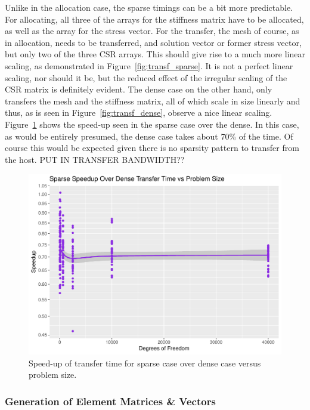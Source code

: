 Unlike in the allocation case, the sparse timings can be a bit more predictable. For allocating, all three of the arrays for the stiffness matrix have to be allocated, as well as the array for the stress vector. For the transfer, the mesh of course, as in allocation, needs to be transferred, and solution vector or former stress vector, but only two of the three CSR arrays. This should give rise to a much more linear scaling, as demonstrated in Figure~\ref{fig:transf_sparse}. It is not a perfect linear scaling, nor should it be, but the reduced effect of the irregular scaling of the CSR matrix is definitely evident. The dense case on the other hand, only transfers the mesh and the stiffness matrix, all of which scale in size linearly and thus, as is seen in Figure~\ref{fig:transf_dense}, observe a nice linear scaling. Figure~\ref{fig:transf_su} shows the speed-up seen in the sparse case over the dense. In this case, as would be entirely presumed, the dense case takes about 70\% of the time. Of course this would be expected given there is no sparsity pattern to transfer from the host. PUT IN TRANSFER BANDWIDTH?? 
\begin{figure}
	\centering
	\includegraphics[width = 0.48\linewidth]{Plots/transf_sparse_dense_speedup_vs_n}
	\caption{Speed-up of transfer time for sparse case over dense case versus problem size.}
	\label{fig:transf_su}
\end{figure}

\subsubsection{Generation of Element Matrices \& Vectors}


